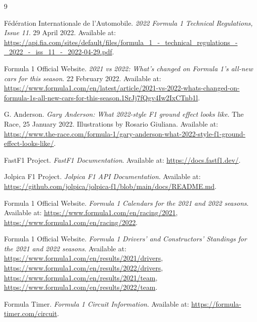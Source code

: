 \documentclass[11pt,a4paper]{article}
\begin{document}
	
	\begin{thebibliography}{9}
		
		Fédération Internationale de l'Automobile.
		\textit{2022 Formula 1 Technical Regulations, Issue 11}.
		29 April 2022.
		Available at:
		\url{https://api.fia.com/sites/default/files/formula_1_-_technical_regulations_-_2022_-_iss_11_-_2022-04-29.pdf}.
		
		Formula 1 Official Website.
		\textit{2021 vs 2022: What's changed on Formula 1's all-new cars
			for this season}.
		22 February 2022.
		Available at:
		\url{https://www.formula1.com/en/latest/article/2021-vs-2022-whats-changed-on-formula-1s-all-new-cars-for-this-season.1SrJj7fQgv4Iw2IxCTnb1l}.
		
		G. Anderson.
		\textit{Gary Anderson: What 2022-style F1 ground effect looks like}.
		The Race, 25 January 2022.
		Illustrations by Rosario Giuliana.
		Available at:
		\url{https://www.the-race.com/formula-1/gary-anderson-what-2022-style-f1-ground-effect-looks-like/}.
		
		FastF1 Project.
		\textit{FastF1 Documentation}.
		Available at:
		\url{https://docs.fastf1.dev/}.
		
		Jolpica F1 Project.
		\textit{Jolpica F1 API Documentation}.
		Available at:
		\url{https://github.com/jolpica/jolpica-f1/blob/main/docs/README.md}.
		
		Formula 1 Official Website.
		\textit{Formula 1 Calendars for the 2021 and 2022 seasons}.
		Available at:
		\url{https://www.formula1.com/en/racing/2021},
		\url{https://www.formula1.com/en/racing/2022}.
		
		Formula 1 Official Website.
		\textit{Formula 1 Drivers' and Constructors' Standings for the
			2021 and 2022 seasons}.
		Available at:
		\url{https://www.formula1.com/en/results/2021/drivers},
		\url{https://www.formula1.com/en/results/2022/drivers},
		\url{https://www.formula1.com/en/results/2021/team},
		\url{https://www.formula1.com/en/results/2022/team}.
		
		Formula Timer.
		\textit{Formula 1 Circuit Information}.
		Available at:
		\url{https://formula-timer.com/circuit}.
		
	\end{thebibliography}

	

	
\end{document}
